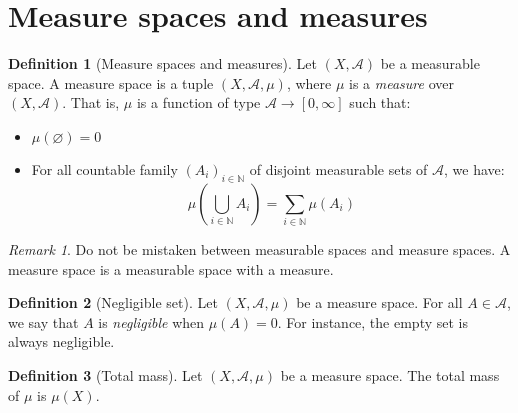 \documentclass{article}
\theoremstyle{definition}
\newtheorem{definition}{Definition}[section]
\theoremstyle{remark}
\newtheorem*{remark}{Remark}
\theoremstyle{example}
\theoremstyle{notation}
\begin{document}
\section{Measure spaces and measures}

\begin{definition}[Measure spaces and measures]
    Let $(X, \mathcal{A})$ be a measurable space. A measure space is a tuple $(X, \mathcal{A}, \mu)$, where $\mu$ is a \textit{measure} over $(X, \mathcal{A})$. That is, $\mu$ is a function of type $\mathcal{A} \rightarrow [0, \infty]$ such that:
    \begin{itemize}
        \item $\mu(\varnothing) = 0$
        \item For all countable family $(A_i)_{i \in \mathbb{N}}$ of disjoint measurable sets of $\mathcal{A}$, we have:
            $$\mu(\bigcup_{i \in \mathbb{N}} A_i) = \sum_{i \in \mathbb{N}} \mu(A_i)$$
    \end{itemize}
\end{definition}

\begin{remark}
    Do not be mistaken between measurable spaces and measure spaces. A measure space is a measurable space with a measure.
\end{remark}

\begin{definition}[Negligible set]
    Let $(X, \mathcal{A}, \mu)$ be a measure space. For all $A \in \mathcal{A}$, we say that $A$ is \textit{negligible} when $\mu(A) = 0$. For instance, the empty set is always negligible.
\end{definition}

\begin{definition}[Total mass]
    Let $(X, \mathcal{A}, \mu)$ be a measure space. The total mass of $\mu$ is $\mu(X)$.
\end{definition}

\end{document}
